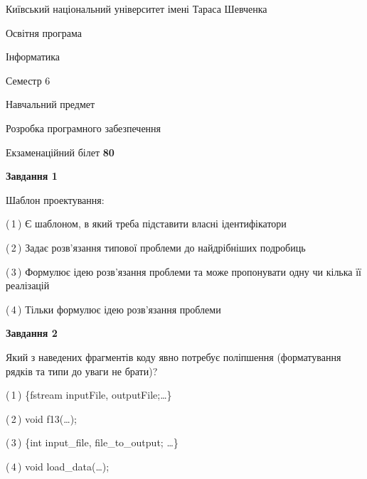 \documentclass[10pt, ukrainian]{article}
\begin{document}
{{\begin {small}\par
{ \center  Київський національний університет імені Тараса Шевченка \par}
{\parbox {5 cm}{Освітня програма \hfill}{\parbox {7 cm}{Інформатика \hfill}}\parbox {6 cm}{\hfill Семестр 6}}\par
{\parbox {5 cm} {Навчальний предмет \hfill}\parbox {7 cm}{Розробка програмного забезпечення \hfill}\parbox {6cm}{\hfill}\par}\vspace{-7pt} \end{small}}{\center Екзаменаційний білет \No \textbf
{ 80 }\par}}
{
\begin {large}
{\begin {center}\textbf{Завдання 1}\end {center}}\par
Шаблон проектування:\par
\vspace{2mm}



(\,1\,) Є шаблоном, в який треба підставити власні ідентифікатори%



(\,2\,) Задає розв'язання типової проблеми до найдрібніших подробиць%



(\,3\,) Формулює ідею розв'язання проблеми та може пропонувати одну чи кілька її реалізацій%



(\,4\,) Тільки формулює ідею розв'язання проблеми%


{\begin {center}\textbf{Завдання 2}\end {center}}\par
Який з наведених фрагментів коду явно потребує поліпшення (форматування рядків та типи до уваги не брати)?\par
\vspace{2mm}



(\,1\,) \{fstream inputFile, outputFile;…\} %



(\,2\,) void f13(…);%



(\,3\,) \{int input\_file, file\_to\_output; …\}%



(\,4\,) void load\_data(…);%



\end{large}}
\end{document}
